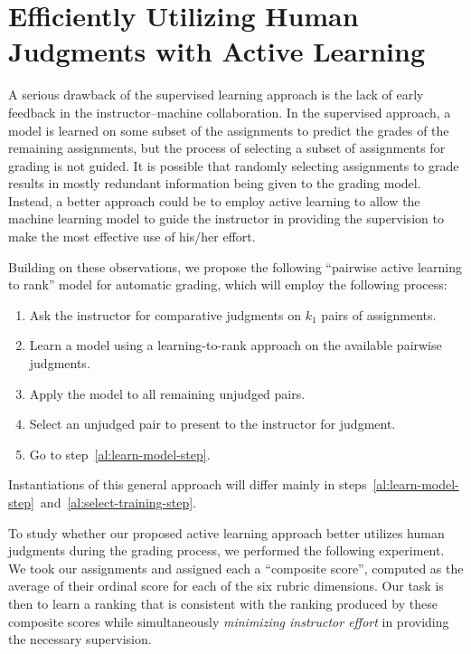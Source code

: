 \section{Efficiently Utilizing Human Judgments with Active Learning}
A serious drawback of the supervised learning approach is the lack
of early feedback in the instructor--machine collaboration. In the
supervised approach, a model is learned on some subset of the assignments
to predict the grades of the remaining assignments, but the process of
selecting a subset of assignments for grading is not guided. It is possible
that randomly selecting assignments to grade results in mostly redundant
information being given to the grading model. Instead, a better approach
could be to employ active learning to allow the machine learning model to
guide the instructor in providing the supervision to make the most
effective use of his/her effort.

Building on these observations, we propose the following ``pairwise active
learning to rank'' model for automatic grading, which will employ the
following process:

\begin{enumerate}
  \item Ask the instructor for comparative judgments on $k_1$ pairs of
    assignments.

  \item Learn a model using a learning-to-rank approach on the available
    pairwise judgments.\label{al:learn-model-step}

  \item Apply the model to all remaining unjudged pairs.

  \item Select an unjudged pair to present to the instructor for
    judgment.\label{al:select-training-step}

  \item Go to step~\ref{al:learn-model-step}.
\end{enumerate}
Instantiations of this general approach will differ mainly in
steps~\ref{al:learn-model-step}~and~\ref{al:select-training-step}.

To study whether our proposed active learning approach better utilizes
human judgments during the grading process, we performed the following
experiment. We took our assignments and assigned each a ``composite
score'', computed as the average of their ordinal score for each of the six
rubric dimensions. Our task is then to learn a ranking that is consistent
with the ranking produced by these composite scores while simultaneously
\emph{minimizing instructor effort} in providing the necessary supervision.

